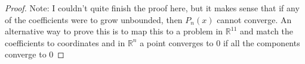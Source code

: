 \documentclass{article}
\numberwithin{equation}{section}
\begin{document}
\begin{enumerate}
\begin{lemma}
\begin{proof}
            \vspace{2mm}

            Note: I couldn't quite finish the proof here, but it makes sense that if any of the coefficients were to grow unbounded, then $P_n(x)$ cannot converge. An alternative way to prove this is to map this to a problem in $\mathbb{R}^{11}$ and match the coefficients to coordinates and in $\mathbb{R}^n$ a point converges to $0$ if all the components converge to $0$ 
        \end{proof}
    \end{lemma}
    


\end{enumerate}
\end{document}
